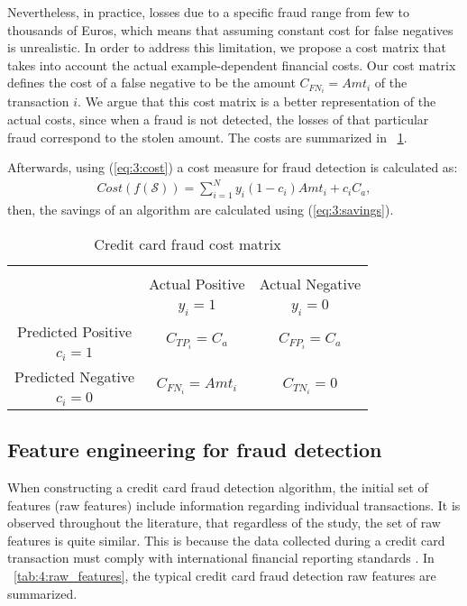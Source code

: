   Nevertheless, in  practice, losses due to a specific fraud  range from few to 
  thousands of Euros, which means that  assuming constant cost for false  negatives is  
  unrealistic. In order to address this limitation, we   propose a 
  cost matrix that takes into account the actual  example-dependent financial costs. Our  cost 
  matrix defines the cost of a false negative to be the   amount $C_{FN_i}=Amt_i$ of the  
  transaction $i$. We argue that this cost matrix is a better representation of the   actual costs, 
  since when a  fraud is not detected, the losses of that particular fraud correspond   to the 
  stolen amount. The costs are summarized in \tablename{~\ref{tab:4:table_costmat_fraud}}.

	Afterwards, using (\ref{eq:3:cost}) a cost measure for fraud detection is calculated as:
  \begin{align} \label{eq:4:cost}
    Cost(f(\mathcal{S})) = \sum_{i=1}^{N} y_i(1-c_i)Amt_i + c_iC_a,
  \end{align}
  then, the savings of an algorithm are calculated using (\ref{eq:3:savings}).

	\begin{table}[t]
		\centering
		\footnotesize
		\begin{tabular}{c | c | c }
		\multicolumn{3}{c}{}\\
			\multicolumn{1}{c|}{}  & Actual Positive& Actual Negative \\
			\multicolumn{1}{c|}{} & $y_i=1$& $y_i=0$ \\
			\hline
			Predicted Positive 		& \multirow{ 2}{*}{$C_{TP_i}=C_a$} & \multirow{ 2}{*}{$C_{FP_i}=C_a$} 
			\\
			$c_i=1$ & &\\
			\hline
			Predicted Negative  	& \multirow{ 2}{*}{$C_{FN_i}=Amt_i$} & \multirow{ 
			2}{*}{$C_{TN_i}=0$} \\
			$c_i=0$ & &\\
		\end{tabular}
		\caption{Credit card fraud cost matrix}
		\label{tab:4:table_costmat_fraud}
	\end{table}
	 
\subsection{Feature engineering for fraud detection}
\label{sec:4:frad:features}

  When constructing a credit card fraud detection algorithm, the initial set of features (raw 
  features) include information regarding individual transactions. It is observed throughout the 
  literature, that regardless of the study, the set of raw features is quite similar. This is 
  because the data collected during a credit card transaction must comply with international 
  financial   reporting standards \citep{Aicpa2011}. In \tablename{~\ref{tab:4:raw_features}}, the 
  typical credit card fraud detection  raw features are summarized.
	
